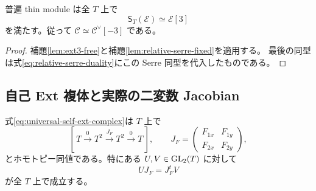 \begin{corollary}\label{cor:universal-serre-fixed}
普遍 thin module は全 $T$ 上で
\[
 \mathsf S_T(\mathcal E)\simeq\mathcal E[3]
\]
を満たす。従って $\mathcal C\simeq\mathcal C^\vee[-3]$ である。
\end{corollary}
\begin{proof}
補題\ref{lem:ext3-free}と補題\ref{lem:relative-serre-fixed}を適用する。
最後の同型は式\eqref{eq:relative-serre-duality}にこの Serre 同型を代入したものである。
\end{proof}

\subsection{自己 Ext 複体と実際の二変数 Jacobian}

\begin{proposition}[単位消去による最小複体]\label{prop:minimal-self-ext}
式\eqref{eq:universal-self-ext-complex}は $T$ 上で
\begin{equation}\label{eq:minimal-universal-ext}
 [\,T\xrightarrow{0}T^2\xrightarrow{J_F}T^2\xrightarrow{0}T\,],
 \qquad J_F=\begin{pmatrix}F_{1x}&F_{1y}\\F_{2x}&F_{2y}\end{pmatrix},
\end{equation}
とホモトピー同値である。特にある $U,V\in\operatorname{GL}_2(T)$ に対して
\begin{equation}\label{eq:chain-self-duality}
 UJ_F=J_F^tV
\end{equation}
が全 $T$ 上で成立する。
\end{proposition}

